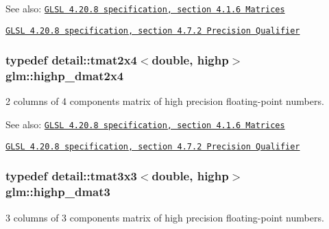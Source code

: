 \begin{Desc}
\item[See also:]\href{http://www.opengl.org/registry/doc/GLSLangSpec.4.20.8.pdf}{\tt GLSL 4.20.8 specification, section 4.1.6 Matrices} 

\href{http://www.opengl.org/registry/doc/GLSLangSpec.4.20.8.pdf}{\tt GLSL 4.20.8 specification, section 4.7.2 Precision Qualifier} \end{Desc}
\hypertarget{group__core__precision_gcd51d8188f7d66a83c035b8c4cd69f2d}{
\subsubsection[highp\_\-dmat2x4]{\setlength{\rightskip}{0pt plus 5cm}typedef detail::tmat2x4$<$double, highp$>$ {\bf glm::highp\_\-dmat2x4}}}
\label{group__core__precision_gcd51d8188f7d66a83c035b8c4cd69f2d}


2 columns of 4 components matrix of high precision floating-point numbers.

\begin{Desc}
\item[See also:]\href{http://www.opengl.org/registry/doc/GLSLangSpec.4.20.8.pdf}{\tt GLSL 4.20.8 specification, section 4.1.6 Matrices} 

\href{http://www.opengl.org/registry/doc/GLSLangSpec.4.20.8.pdf}{\tt GLSL 4.20.8 specification, section 4.7.2 Precision Qualifier} \end{Desc}
\hypertarget{group__core__precision_g993461e1d2caf19abd4f64d02ccdafa9}{
\subsubsection[highp\_\-dmat3]{\setlength{\rightskip}{0pt plus 5cm}typedef detail::tmat3x3$<$double, highp$>$ {\bf glm::highp\_\-dmat3}}}
\label{group__core__precision_g993461e1d2caf19abd4f64d02ccdafa9}


3 columns of 3 components matrix of high precision floating-point numbers.

